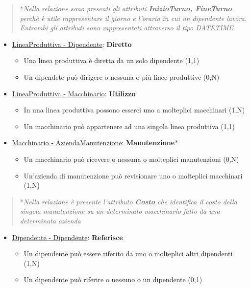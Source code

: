 \begin{verse}
	*\emph{Nella relazione sono presenti gli attributi \textbf{InizioTurno, FineTurno} perchè è utile rappresentare il giorno e l'orario in cui un dipendente lavora. Entrambi gli attributi sono rappresentati attraverso il tipo DATETIME}
\end{verse}

\begin{itemize}
	\item \underline{LineaProduttiva - Dipendente}: \textbf{Diretto}
	
	\begin{itemize}
		\item Una linea produttiva è diretta da un solo dipendente (1,1)
		\item Un dipendete può dirigere o nessuna o più linee produttive (0,N)
	\end{itemize}
	
\end{itemize}

\begin{itemize}
	\item \underline{LineaProduttiva - Macchinario}: \textbf{Utilizzo}
	
	\begin{itemize}
		\item In una linea produttiva possono esserci uno a molteplici macchinari (1,N)
		\item Un macchinario può appartenere ad una singola linea produttiva (1,1)
	\end{itemize}
	
\end{itemize}

\begin{itemize}
	\item \underline{Macchinario - AziendaManutenzione}: \textbf{Manutenzione}*
	
	\begin{itemize}
		\item Un macchinario può ricevere o nessuna o molteplici manutenzioni (0,N)
		\item Un'azienda di manutenzione può revisionare uno o molteplici macchinari (1,N)
	\end{itemize}
	
\end{itemize}

\begin{verse}
	*\emph{Nella relazione è presente l'attributo \textbf{Costo} che identifica il costo della singola manutenzione su un determinato macchinario fatto da una determinata azienda}
\end{verse}

\begin{itemize}
	\item \underline{Dipendente - Dipendente}: \textbf{Referisce}
	
	\begin{itemize}
		\item Un dipendente può essere riferito da uno o molteplici altri dipendenti (1,N)
		\item Un dipendente può riferire o nessuno o un dipendente (0,1)
	\end{itemize}
	
\end{itemize}